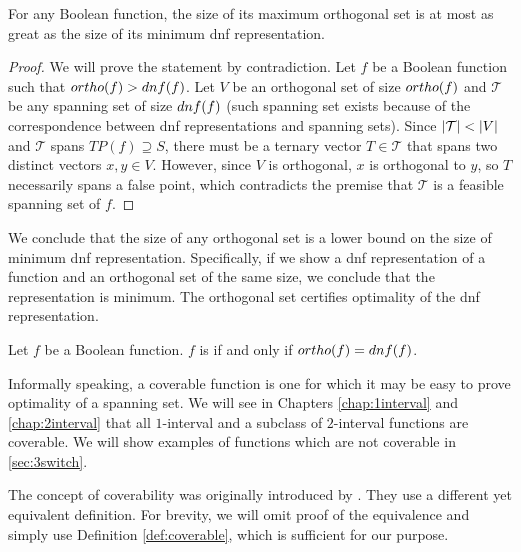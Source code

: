 \begin{theorem}
\label{theorem:orthodnf}
For any Boolean function,
the size of its maximum orthogonal set
is at most as great
as the size of its minimum \acrshort{dnf} representation.
\end{theorem}

\begin{proof}
We will prove the statement by contradiction.
Let $f$ be a Boolean function such that
$ortho (f) > dnf (f)$.
Let $V$ be an orthogonal set of size $ortho (f)$
and $\mathcal{T}$ be any spanning set
of size $dnf (f)$
(such spanning set exists because of the correspondence
between \acrshort{dnf} representations and spanning sets).
Since $\lvert\mathcal{T}\rvert < \lvert V\rvert$
and $\mathcal{T}$ spans $TP(f) \supseteq S$,
there must be a ternary vector $T \in \mathcal{T}$
that spans
two distinct vectors $x, y \in V$.
However,
since $V$ is orthogonal,
$x$ is orthogonal to $y$,
so $T$ necessarily spans a false point,
which contradicts the premise that $\mathcal{T}$
is a feasible spanning set of $f$.
\end{proof}

We conclude that the size of any orthogonal set
is a lower bound on the size of minimum
\acrshort{dnf} representation.
Specifically,
if we show a \acrshort{dnf} representation of a function
and an orthogonal set of the same size,
we conclude that the representation is minimum.
The orthogonal set certifies
optimality of the \acrshort{dnf} representation.

\begin{definition}
\label{def:coverable}
Let $f$ be a Boolean function.
$f$ is 
if and only if
$ortho (f) = dnf (f)$.
\end{definition}

Informally speaking,
a coverable function is one for which it may be
easy to prove optimality of a spanning set.
We will see
in Chapters \ref{chap:1interval} and \ref{chap:2interval}
that all $1$-interval
and a subclass of $2$-interval functions
are coverable.
We will show examples of functions which are not coverable
in \autoref{sec:3switch}.

The concept of coverability was originally introduced by
\citet{Cepek2012}.
They use a different yet equivalent definition.
For brevity,
we will omit proof of the equivalence
and simply use Definition \ref{def:coverable},
which is sufficient for our purpose.

